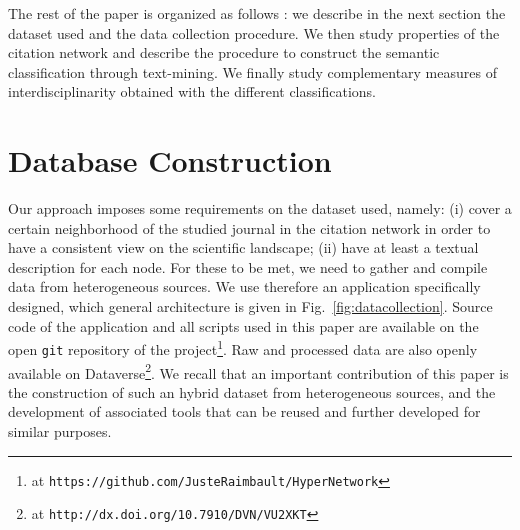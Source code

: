 

The rest of the paper is organized as follows : we describe in the next section the dataset used and the data collection procedure. We then study properties of the citation network and describe the procedure to construct the semantic classification through text-mining. We finally study complementary measures of interdisciplinarity obtained with the different classifications.




\section*{Database Construction}
\label{sec:data}



Our approach imposes some requirements on the dataset used, namely: (i) cover a certain neighborhood of the studied journal in the citation network in order to have a consistent view on the scientific landscape; (ii) have at least a textual description for each node. For these to be met, we need to gather and compile data from heterogeneous sources. We use therefore an application specifically designed, which general architecture is given in Fig.~\ref{fig:datacollection}. Source code of the application and all scripts used in this paper are available on the open \texttt{git} repository of the project\footnote{at \texttt{https://github.com/JusteRaimbault/HyperNetwork}}. Raw and processed data are also openly available on Dataverse\footnote{at \texttt{http://dx.doi.org/10.7910/DVN/VU2XKT}}. We recall that an important contribution of this paper is the construction of such an hybrid dataset from heterogeneous sources, and the development of associated tools that can be reused and further developed for similar purposes.



